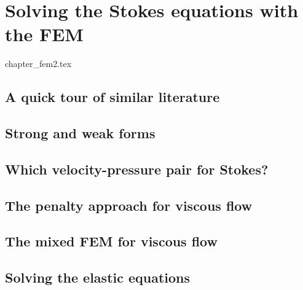 \chapter{Solving the Stokes equations with the FEM} \label{solvingFEM} %
\begin{flushright} {\tiny {\color{gray} chapter\_fem2.tex}} \end{flushright}

\section{A quick tour of similar literature} 
 

\newpage %
\section{Strong and weak forms}  %

\newpage %
\section{Which velocity-pressure pair for Stokes?}\label{ss:pair} %

\newpage %
\section{The penalty approach for viscous flow}\label{sec:penalty} %

\newpage %
\section{The mixed FEM for viscous flow} \label{sec:mixed}  %


\newpage %
\section{Solving the elastic equations}  %

